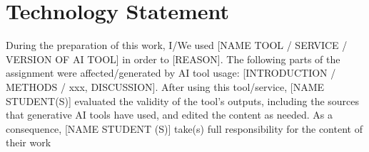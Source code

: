 \documentclass{article}
\begin{document}
\printbibliography

\section{Technology Statement}
During the preparation of this work, I/We used [NAME TOOL / SERVICE / VERSION OF AI
TOOL] in order to [REASON]. The following parts of the assignment were
affected/generated by AI tool usage: [INTRODUCTION / METHODS / xxx, DISCUSSION].
After using this tool/service, [NAME STUDENT(S)] evaluated the validity of the tool's
outputs, including the sources that generative AI tools have used, and edited the
content as needed. As a consequence, [NAME STUDENT (S)] take(s) full responsibility
for the content of their work
\end{document}
